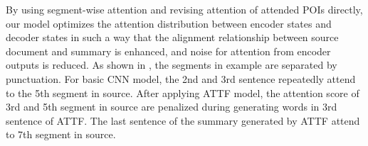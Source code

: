 

By using segment-wise attention and revising attention \DIFdelbegin {}\DIFdelend \DIFaddbegin {}\DIFaddend of attended POIs directly,
our model optimizes the
attention distribution between encoder states and decoder states in such a way that
the alignment relationship between source document and summary is enhanced, 
and noise for attention from encoder outputs is reduced. 
As shown in , the segments in example are separated by punctuation.
For basic CNN model, the 2nd and 3rd sentence repeatedly attend to 
the 5th segment in source.
After applying ATTF model, 
the attention score of 3rd and 5th segment in source are penalized 
during generating words in 3rd sentence of ATTF.
The last sentence of the summary generated by ATTF attend to 7th segment in source.

